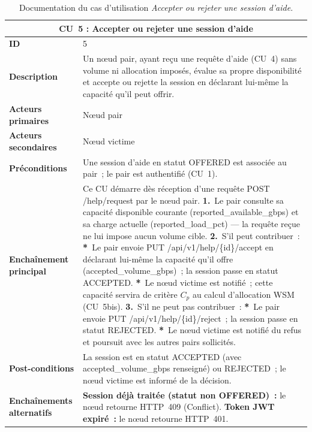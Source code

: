 \begin{table}[H]
\centering
\renewcommand{\arraystretch}{1.5}
\begin{tabular}{|p{3.5cm}|p{10.5cm}|}
\hline
\multicolumn{2}{|c|}{\textbf{CU~5 : Accepter ou rejeter une session d'aide}} \\
\hline
\textbf{ID} & 5 \\
\hline
\textbf{Description} & Un nœud pair, ayant reçu une requête d'aide (CU~4) sans volume ni allocation imposés, évalue sa propre disponibilité et accepte ou rejette la session en déclarant lui-même la capacité qu'il peut offrir. \\
\hline
\textbf{Acteurs primaires} & Nœud pair \\
\hline
\textbf{Acteurs secondaires} & Nœud victime \\
\hline
\textbf{Préconditions} & Une session d'aide en statut {OFFERED} est associée au pair~; le pair est authentifié (CU~1). \\
\hline
\textbf{Enchaînement principal} &
Ce CU démarre dès réception d'une requête {POST /help/request} par le nœud pair.\newline
\textbf{1.}\ Le pair consulte sa capacité disponible courante ({reported\_available\_gbps}) et sa charge actuelle ({reported\_load\_pct}) — la requête reçue ne lui impose aucun volume cible.\newline
\textbf{2.}\ S'il peut contribuer~:\newline
\quad \textbf{*}\ Le pair envoie {PUT /api/v1/help/\{id\}/accept} en déclarant lui-même la capacité qu'il offre ({accepted\_volume\_gbps})~; la session passe en statut {ACCEPTED}.\newline
\quad \textbf{*}\ Le nœud victime est notifié~; cette capacité servira de critère $C_p$ au calcul d'allocation WSM (CU~5bis).\newline
\textbf{3.}\ S'il ne peut pas contribuer~:\newline
\quad \textbf{*}\ Le pair envoie {PUT /api/v1/help/\{id\}/reject}~; la session passe en statut {REJECTED}.\newline
\quad \textbf{*}\ Le nœud victime est notifié du refus et poursuit avec les autres pairs sollicités. \\
\hline
\textbf{Post-conditions} & La session est en statut {ACCEPTED} (avec {accepted\_volume\_gbps} renseigné) ou {REJECTED}~; le nœud victime est informé de la décision. \\
\hline
\textbf{Enchaînements alternatifs} &
\textbf{Session déjà traitée (statut non {OFFERED})~:} le nœud retourne HTTP~409 (Conflict).\newline
\textbf{Token JWT expiré~:} le nœud retourne HTTP~401. \\
\hline
\end{tabular}
\caption{Documentation du cas d'utilisation \textit{Accepter ou rejeter une session d'aide}.}
\label{tab:cu5}
\end{table}


